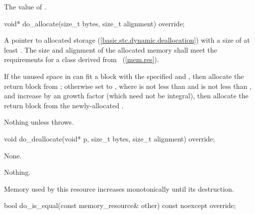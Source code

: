 \begin{itemdescr}
\pnum
\returns
The value of .
\end{itemdescr}

%
\begin{itemdecl}
void* do_allocate(size_t bytes, size_t alignment) override;
\end{itemdecl}

\begin{itemdescr}
\pnum
\returns
A pointer to allocated storage (\ref{basic.stc.dynamic.deallocation})
with a size of at least .
The size and alignment of the allocated memory shall meet the requirements
for a class derived from ~(\ref{mem.res}).

\pnum
\effects
If the unused space in 
can fit a block with the specified  and ,
then allocate the return block from ;
otherwise set  to ,
where  is not less than  and
 is not less than ,
and increase 
by an  growth factor (which need not be integral),
then allocate the return block from the newly-allocated .

\pnum
\throws
Nothing unless  throws.
\end{itemdescr}

%
\begin{itemdecl}
void do_deallocate(void* p, size_t bytes, size_t alignment) override;
\end{itemdecl}

\begin{itemdescr}
\pnum
\effects
None.

\pnum
\throws
Nothing.

\pnum
\remarks
Memory used by this resource increases monotonically until its destruction.
\end{itemdescr}

%
\begin{itemdecl}
bool do_is_equal(const memory_resource& other) const noexcept override;
\end{itemdecl}

